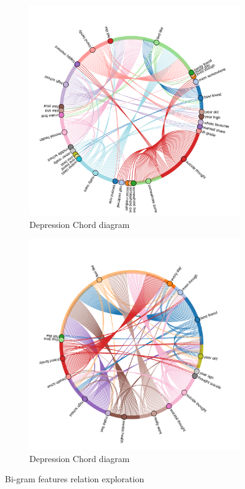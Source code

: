 \documentclass[sn-mathphys,Numbered]{sn-jnl}%
\theoremstyle{thmstyleone}%
\theoremstyle{thmstyletwo}%
\theoremstyle{thmstylethree}%
\begin{document}
\begin{figure}[H]
\centering
\begin{subfigure}{0.8\textwidth}
    \includegraphics[width=\textwidth]{dep_chord.png}
    \caption{Depression Chord diagram}
    \label{fig:first}
\end{subfigure}
\hfill
\begin{subfigure}{0.8\textwidth}
    \includegraphics[width=\textwidth]{suicide_chord.png}
    \caption{Depression Chord diagram}
    \label{fig:second}
\end{subfigure}        
\caption{Bi-gram features relation exploration}
\label{Bigram_features_exp}
\end{figure}
\end{document}
